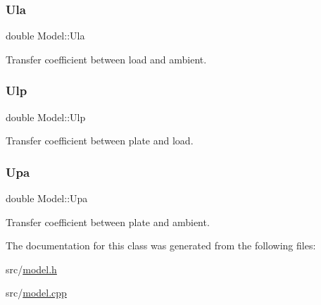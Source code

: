 \subsubsection{\texorpdfstring{Ula}{Ula}}
{\footnotesize\ttfamily double Model\+::\+Ula\hspace{0.3cm}{\ttfamily [private]}}



Transfer coefficient between load and ambient. 

\mbox{\label{class_model_a6fc46b2708f4a8adf661b6017100d468}} 
\subsubsection{\texorpdfstring{Ulp}{Ulp}}
{\footnotesize\ttfamily double Model\+::\+Ulp\hspace{0.3cm}{\ttfamily [private]}}



Transfer coefficient between plate and load. 

\mbox{\label{class_model_aa90ed4603369e2af1fc311702854e6c5}} 
\subsubsection{\texorpdfstring{Upa}{Upa}}
{\footnotesize\ttfamily double Model\+::\+Upa\hspace{0.3cm}{\ttfamily [private]}}



Transfer coefficient between plate and ambient. 



The documentation for this class was generated from the following files\+:\begin{DoxyCompactItemize}
\item 
src/\mbox{\hyperlink{model_8h}{model.\+h}}\item 
src/\mbox{\hyperlink{model_8cpp}{model.\+cpp}}\end{DoxyCompactItemize}
